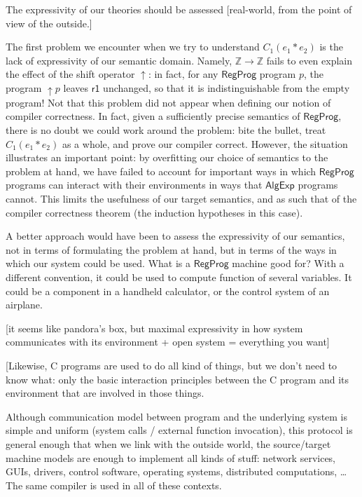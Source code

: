 \documentclass[sigplan,10pt,review,anonymous]{acmart}
\newcommand{\kw}[1]{\ensuremath{ \textsf{#1} }}
\begin{document}
The expressivity of our theories
should be assessed
[real-world,
from the point of view of the outside.]

The first problem we encounter when we try to understand $C_1(e_1 * e_2)$
is the lack of expressivity of our semantic domain.
Namely,
$\mathbb{Z} \rightarrow \mathbb{Z}$
fails to even explain the effect of the shift operator $\uparrow$:
in fact, for any $\kw{RegProg}$ program $p$,
the program ${\uparrow}p$ leaves $\kw{r1}$ unchanged,
so that it is indistinguishable from the empty program!
Not that this problem did not appear
when defining our notion of compiler correctness.
In fact,
given a sufficiently precise semantics of $\kw{RegProg}$,
there is no doubt we could work around the problem:
bite the bullet, treat $C_1(e_1 * e_2)$ as a whole,
and prove our compiler correct.
However,
the situation illustrates an important point:
by overfitting our choice of semantics to the problem at hand,
we have failed to account for important ways in which
$\kw{RegProg}$ programs can interact with their environments
in ways that $\kw{AlgExp}$ programs cannot.
This limits the usefulness of our target semantics,
and as such that of the compiler correctness theorem
(the induction hypotheses in this case).

A better approach would have been to
assess the expressivity of our semantics,
not in terms of formulating the problem at hand,
but in terms of the ways in which our system
could be used.
What is a $\kw{RegProg}$ machine good for?
With a different convention,
it could be used to compute function of several variables.
It could be a component in a handheld calculator,
or the control system of an airplane.

[it seems like pandora's box,
but maximal expressivity in how system communicates with its environment
+ open system = everything you want]




[Likewise, C programs are used to do all kind of things,
but we don't need to know what:
only the basic interaction principles
between the C program and its environment that are involved
in those things.





Although communication model between program
and the underlying system is simple and uniform
(system calls / external function invocation),
this protocol is general enough that
when we link with the outside world,
the source/target machine models are enough to
implement all kinds of stuff:
network services, GUIs, drivers, control software,
operating systems, distributed computations, \ldots
The same compiler is used in all of these contexts.
\end{document}
